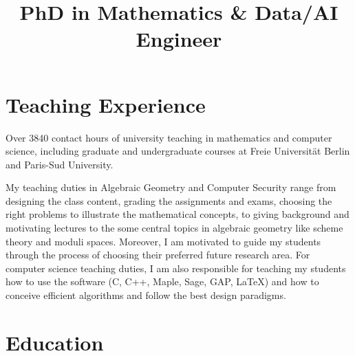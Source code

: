 \documentclass[11pt,a4paper,sans]{moderncv}        %
\title{PhD in Mathematics  \& Data/AI Engineer}                               %
\begin{document}
\makecvtitle
\vspace*{-1cm}


\section{Teaching Experience}

Over 3840 contact hours of university teaching in mathematics and computer science,
including graduate and undergraduate courses at Freie Universität Berlin and Paris-Sud University.

My teaching duties in Algebraic Geometry and Computer Security range from designing the class content, grading the assignments and exams,  choosing the right problems to illustrate the mathematical concepts, to 
giving background and motivating lectures to the some central topics in algebraic geometry like scheme theory and moduli spaces. Moreover, I am motivated to guide my students through the process of choosing their preferred future research area. For computer science teaching duties, I am also responsible for teaching my students how to use the software (C, C++, Maple, Sage, GAP, LaTeX) and how to conceive efficient algorithms and follow the best design paradigms.

\section{Education}
\end{document}
